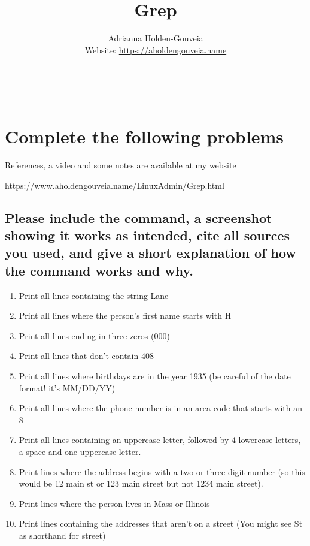 \documentclass[12pt]{article}
\title{Grep}
\author{
        Adrianna Holden-Gouveia \\
        Website: \url{https://aholdengouveia.name}\\
        \date{\vspace{-5ex}} 
        \faLinkedin{: aholdengouveia} \\
        \faGithub {: aholdengouveia} \\
        }
\begin{document}
    

\maketitle


\section*{Complete the following problems}

References, a video and some notes are available at my website

https://www.aholdengouveia.name/LinuxAdmin/Grep.html

\subsection*{Please include the command, a screenshot showing it works as intended, cite all sources you used, and give a short explanation of how the command works and why.}
    \begin{enumerate}
        \item Print all lines containing the string Lane
        \item Print all lines where the person's first name starts with H
        \item Print all lines ending in three zeros (000)
        \item Print all lines that don't contain 408
        \item Print all lines where birthdays are in the year 1935 (be careful of the date format! it's MM/DD/YY)
        \item Print all lines where the phone number is in an area code that starts with an 8
        \item Print all lines containing an uppercase letter, followed by 4 lowercase letters, a space and one uppercase letter.
        \item Print lines where the address begins with a two or three digit number (so this would be 12 main st or 123 main street but not 1234 main street).
        \item Print lines where the person lives in Mass or Illinois
        \item Print lines containing the addresses that aren't on a street (You might see St as shorthand for street)


    \end{enumerate}
\end{document}
